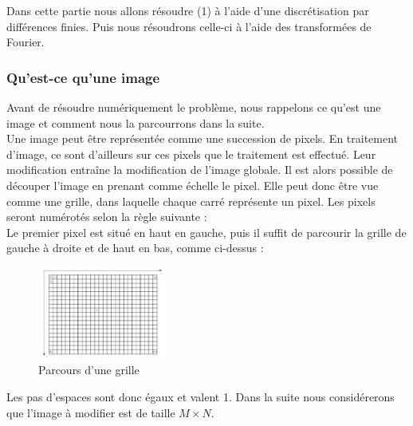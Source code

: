Dans cette partie nous allons résoudre (1) à l'aide d'une discrétisation par différences finies. Puis nous résoudrons celle-ci à l'aide des transformées de Fourier. \\
\subsubsection{Qu'est-ce qu'une image}
Avant de résoudre numériquement le problème, nous rappelons ce qu'est une image et comment nous la  parcourrons dans la suite.\\
Une image peut être représentée comme une succession de pixels. En traitement d'image, ce sont d'ailleurs sur ces pixels que le traitement est effectué. Leur modification entraîne la modification de l'image globale. Il est alors possible de découper l'image en prenant comme échelle le pixel. Elle peut donc être vue comme une grille, dans laquelle chaque carré représente un pixel. Les pixels seront numérotés selon la règle suivante : \\

Le premier pixel est situé en haut en gauche, puis il suffit de parcourir la grille de gauche à droite et de haut en bas, comme ci-dessus :  
\begin{figure}[!h]
     \centering
     \includegraphics[width = 120pt]{Images/grille.png}
	\caption{Parcours d'une grille}
\end{figure}

Les pas d'espaces sont donc égaux et valent 1. Dans la suite nous considérerons que l'image à modifier est de taille $M \times N$.

